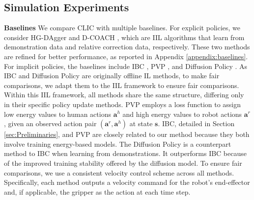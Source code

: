 \subsection{Simulation Experiments}
\label{sec:exp:simulation}
\textbf{Baselines} We compare CLIC with multiple baselines.
For explicit policies, we consider HG-DAgger \cite{2019_HG_DAgger} and D-COACH \cite{2019_Rodrigo_D_COACH}, which are IIL algorithms that learn from demonstration data and relative correction data, respectively. These two methods are refined for better performance, as reported in Appendix \ref{appendix:baselines}.
For implicit policies, the baselines include IBC \cite{2022_implicit_BC}, PVP \cite{2023_NIPS_PVP}, and Diffusion Policy \cite{2023_diffusionpolicy}. 
As IBC and Diffusion Policy are originally offline IL methods, to make fair comparisons, we adapt them to the IIL framework to ensure fair comparisons. 
Within this IIL framework, all methods share the same structure, differing only in their specific policy update methods.
PVP \cite{2023_NIPS_PVP} employs a loss function to assign low energy values to human actions $\bm a^h$ and high energy values to robot actions $\bm a^r$, given an observed action pair $(\bm a^r, \bm a^h)$ at state $\bm s$.
IBC, detailed in Section \ref{sec:Preliminaries}, and PVP are closely related to our method because they both involve training energy-based models. 
The Diffusion Policy is a counterpart method to IBC when learning from demonstrations. It outperforms IBC because of the improved training stability offered by the diffusion model. 
To ensure fair comparisons, we use a consistent velocity control scheme across all methods. Specifically, each method outputs a velocity command for the robot's end-effector and, if applicable, the gripper as the action at each time step.

